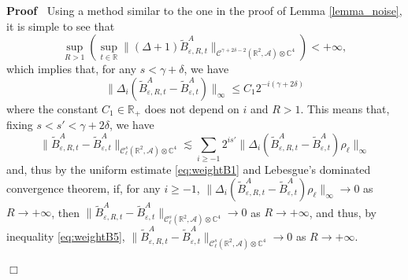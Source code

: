\documentclass{article}
\newenvironment{proof}{\noindent\textbf{Proof\ }}{\hspace*{\fill}$\Box$\medskip}
\begin{document}
\begin{proof}
  Using a method similar to the one in the proof of Lemma \ref{lemma_noise},
  it is simple to see that
  \[ \sup_{R > 1} (\sup_{t \in \mathbb{R}} \| (\Delta + 1)
     \tilde{B}^A_{\varepsilon, R, t} \|_{\mathcal{C}^{\gamma + 2 \delta - 2}
     (\mathbb{R}^2, \mathcal{A}) \otimes \mathbb{C}^4}) < + \infty,_{} \]
  which implies that, for any $s < \gamma + \delta$, we have
  \begin{equation}
    \| \Delta_i (\tilde{B}^A_{\varepsilon, R, t} - \tilde{B}^A_{\varepsilon,
    t}) \|_{\infty} \leqslant C_1 2^{- i (\gamma + 2 \delta)}
    \label{eq:weightB1}
  \end{equation}
  where the constant $C_1 \in \mathbb{R}_+$ does not depend on $i$ and $R >
  1$. This means that, fixing $s < s' < \gamma + 2 \delta$, we have
  \begin{equation}
    \| \tilde{B}^A_{\varepsilon, R, t} - \tilde{B}^A_{\varepsilon, t}
    \|_{\mathcal{C}^s_{\ell} (\mathbb{R}^2, \mathcal{A}) \otimes \mathbb{C}^4}
    \lesssim \sum_{i \geqslant - 1} 2^{i s'} \| \Delta_i
    (\tilde{B}^A_{\varepsilon, R, t} - \tilde{B}^A_{\varepsilon, t})
    \rho_{\ell} \|_{\infty} \label{eq:weightB5}
  \end{equation}
  and, thus by the uniform estimate {\eqref{eq:weightB1}} and Lebesgue's
  dominated convergence theorem, if, for any $i \geqslant - 1$, $\| \Delta_i
  (\tilde{B}^A_{\varepsilon, R, t} - \tilde{B}^A_{\varepsilon, t}) \rho_{\ell}
  \|_{\infty} \rightarrow 0$ as $R \rightarrow + \infty$, then $\|
  \tilde{B}^A_{\varepsilon, R, t} - \tilde{B}^A_{\varepsilon, t}
  \|_{\mathcal{C}^s_{\ell} (\mathbb{R}^2, \mathcal{A}) \otimes \mathbb{C}^4}
  \rightarrow 0$ as $R \rightarrow + \infty$, and thus, by inequality
  {\eqref{eq:weightB5}}, $\| \tilde{B}^A_{\varepsilon, R, t} -
  \tilde{B}^A_{\varepsilon, t} \|_{\mathcal{C}^s_{\ell} (\mathbb{R}^2,
  \mathcal{A}) \otimes \mathbb{C}^4} \rightarrow 0$ as $R \rightarrow +
  \infty$.
  

\end{proof}
\end{document}
